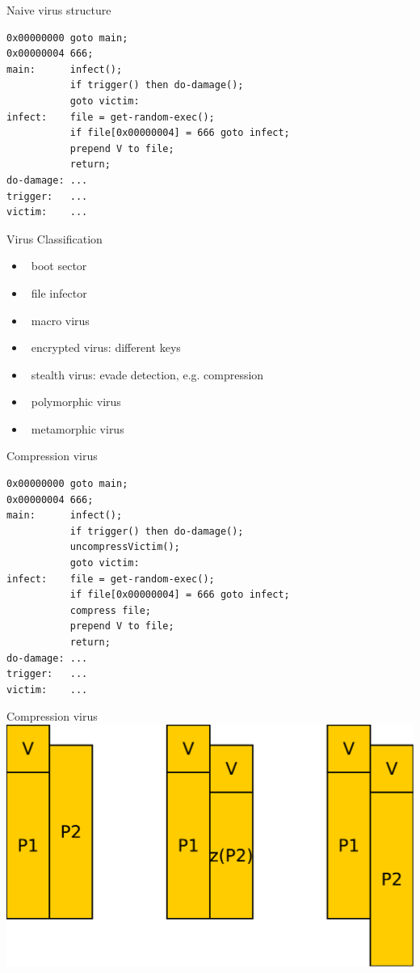 \documentclass{beamer}
\begin{document}
\begin{frame}[fragile]{Naive virus structure}
  \begin{verbatim}
0x00000000 goto main;
0x00000004 666;
main:      infect();
           if trigger() then do-damage();
           goto victim:
infect:    file = get-random-exec();
           if file[0x00000004] = 666 goto infect;
           prepend V to file;
           return;
do-damage: ...
trigger:   ...
victim:    ...
  \end{verbatim}
\end{frame}


\begin{frame}{Virus Classification}
  \begin{itemize}
  \item  boot sector 
  \item  file infector 
  \item  macro virus 
  \item  encrypted virus: different keys 
  \item  stealth virus: evade detection, e.g. 
    compression 
  \item  polymorphic virus 
  \item  metamorphic virus
  \end{itemize}
\end{frame}

\begin{frame}[fragile]{Compression virus}
  \begin{verbatim}
0x00000000 goto main;
0x00000004 666;
main:      infect();
           if trigger() then do-damage();
           uncompressVictim();
           goto victim:
infect:    file = get-random-exec();
           if file[0x00000004] = 666 goto infect;
           compress file;
           prepend V to file;
           return;
do-damage: ...
trigger:   ...
victim:    ...
  \end{verbatim}
\end{frame}

\begin{frame}{Compression virus}
\includegraphics[width=0.8\linewidth]{compressingVirus}
\end{frame}
\end{document}
